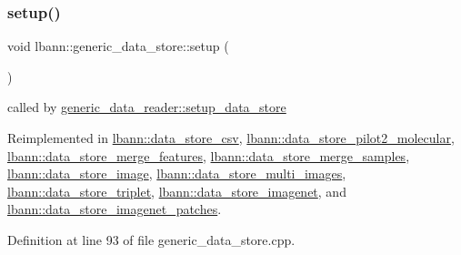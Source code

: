 \mbox{\label{classlbann_1_1generic__data__store_a1cff17def02ee21b6ca0befeb04bb582}} 
\subsubsection{\texorpdfstring{setup()}{setup()}}
{\footnotesize\ttfamily void lbann\+::generic\+\_\+data\+\_\+store\+::setup (\begin{DoxyParamCaption}{ }\end{DoxyParamCaption})\hspace{0.3cm}{\ttfamily [virtual]}}



called by \hyperlink{classlbann_1_1generic__data__reader_a8b2a09d38512fc11f1b9d572c89100a7}{generic\+\_\+data\+\_\+reader\+::setup\+\_\+data\+\_\+store} 



Reimplemented in \hyperlink{classlbann_1_1data__store__csv_a184c7e6f27c5e07255b9c889ace02407}{lbann\+::data\+\_\+store\+\_\+csv}, \hyperlink{classlbann_1_1data__store__pilot2__molecular_a975d7907053a8b2e92ea5f77ca4ae7a3}{lbann\+::data\+\_\+store\+\_\+pilot2\+\_\+molecular}, \hyperlink{classlbann_1_1data__store__merge__features_aecb1fbbbc0c0ee9647cf178487eb2c02}{lbann\+::data\+\_\+store\+\_\+merge\+\_\+features}, \hyperlink{classlbann_1_1data__store__merge__samples_a9f7f027eab6bfb65dd8001939769f476}{lbann\+::data\+\_\+store\+\_\+merge\+\_\+samples}, \hyperlink{classlbann_1_1data__store__image_a79280b3aa9a207dfacad2bcc9824ec73}{lbann\+::data\+\_\+store\+\_\+image}, \hyperlink{classlbann_1_1data__store__multi__images_a7b5e9ec7b7132872299a204d5d24ee62}{lbann\+::data\+\_\+store\+\_\+multi\+\_\+images}, \hyperlink{classlbann_1_1data__store__triplet_aca66b9cf71d7ba2b9870e76c5b92b5e8}{lbann\+::data\+\_\+store\+\_\+triplet}, \hyperlink{classlbann_1_1data__store__imagenet_a611aa1734a491c443396a077b49fe4fe}{lbann\+::data\+\_\+store\+\_\+imagenet}, and \hyperlink{classlbann_1_1data__store__imagenet__patches_aa8cfaf12c87f3dbbbb4fc808f6ca26ad}{lbann\+::data\+\_\+store\+\_\+imagenet\+\_\+patches}.



Definition at line 93 of file generic\+\_\+data\+\_\+store.\+cpp.


